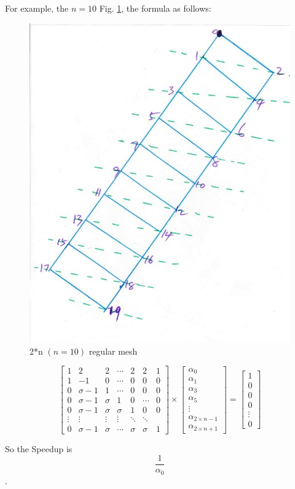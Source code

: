 For example, the $n = 10$ Fig. \ref{210f}, the formula as follows:

\begin{figure}[h]
\centering\includegraphics[width=0.7\linewidth]{figure/c210_f}
\caption{2*n $(n = 10)$ regular mesh}
\label{210f}
\end{figure}


\begin{equation}
{
\left[ \begin{array}{ccccccc}
1 & 2 & 2 & \cdots & 2 & 2 & 1\\
1 & -1 & 0 & \cdots& 0 & 0 & 0\\
0 & \sigma-1 & 1 & \cdots & 0 & 0 & 0 \\
0 & \sigma-1 & \sigma & 1 & 0 & \cdots & 0 \\
0 & \sigma-1 & \sigma & \sigma & 1 & 0 & 0 \\
\vdots & \vdots & \vdots  &   \vdots & \ddots & \ddots\\
0 & \sigma-1 & \sigma & \cdots & \sigma & \sigma & 1
\end{array} 
\right ]} \times \left[ \begin{array}{c}
\alpha_{0} \\
\alpha_{1} \\
\alpha_{3} \\
\alpha_{5} \\
\vdots \\
\alpha_{2 \times n - 1}\\
\alpha_{2 \times n + 1}
\end{array} 
\right ] = \left[ \begin{array}{c}
1 \\
0 \\
0 \\
0 \\
\vdots \\
0
\end{array} 
\right ]
\end{equation}

So the Speedup is $$\frac{1}{\alpha_{0}}$$.
\vspace*{50pt}
